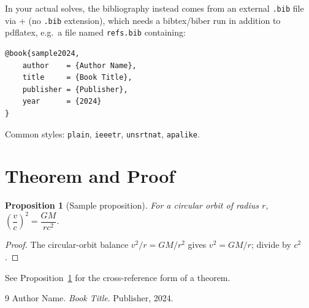 \documentclass{article}
\newtheorem{proposition}{Proposition}          %
\begin{document}
In your actual solves, the bibliography instead comes from an external
\texttt{.bib} file via \verb|| + \verb||
(no \texttt{.bib} extension), which needs a bibtex/biber run in addition to
pdflatex, e.g.\ a file named \texttt{refs.bib} containing:
\begin{verbatim}
@book{sample2024,
    author    = {Author Name},
    title     = {Book Title},
    publisher = {Publisher},
    year      = {2024}
}
\end{verbatim}
Common styles: \texttt{plain}, \texttt{ieeetr}, \texttt{unsrtnat}, \texttt{apalike}.

\section{Theorem and Proof}

\begin{proposition}[Sample proposition]
\label{prop:sample}
For a circular orbit of radius $r$, $\left(\dfrac{v}{c}\right)^2 = \dfrac{GM}{rc^2}$.
\end{proposition}

\begin{proof}
The circular-orbit balance $v^2/r = GM/r^2$ gives $v^2 = GM/r$; divide by $c^2$.
\end{proof}

See Proposition~\ref{prop:sample} for the cross-reference form of a theorem.

\begin{thebibliography}{9}
 Author Name. \textit{Book Title}. Publisher, 2024.
\end{thebibliography}



\end{document}

